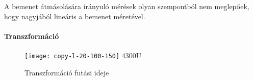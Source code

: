 A bemenet \'atm\'asol\'as\'ara ir\'anyul\'o m\'er\'esek olyan szempontb\'ol nem meglep\H oek, hogy nagyj\'ab\'ol line\'aris a bemenet m\'eret\'evel.

\paragraph{Transzform\'aci\'o}

\begin{figure}[h]
	\texttt{[image: copy-l-20-100-150]}
	{4300U}
	\centering
	\caption{Transzform\'aci\'o fut\'asi ideje}
\end{figure}

